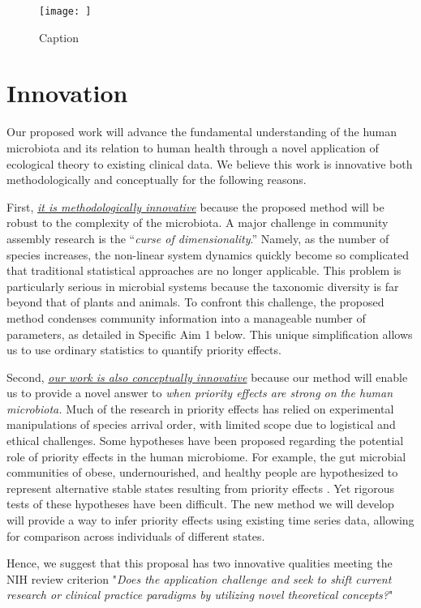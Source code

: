 \documentclass[12pt, class=article, crop=false]{standalone}
\begin{document}
\begin{figure}
    \centering
    \texttt{[image: ]}
    \caption{Caption}
    \label{fig:enter-label}
\end{figure}

\section{Innovation}
Our proposed work will advance the fundamental understanding of the human microbiota and its relation to human health through a novel application of ecological theory to existing clinical data.
We believe this work is innovative both methodologically and conceptually for the following reasons.

First, \ul{\emph{it is methodologically innovative}} because the proposed method will be robust to the complexity of the microbiota.
A major challenge in community assembly research is the ``\textit{curse of dimensionality}.''
Namely, as the number of species increases, the non-linear system dynamics quickly become so complicated that traditional statistical approaches are no longer applicable.
This problem is particularly serious in microbial systems because the taxonomic diversity is far beyond that of plants and animals.
To confront this challenge, the proposed method condenses community information into a manageable number of parameters, as detailed in Specific Aim 1 below. 
This unique simplification allows us to use ordinary statistics to quantify priority effects.

Second, \ul{\emph{our work is also conceptually innovative}} because our method will enable us to provide a novel answer to \textit{when priority effects are strong on the human microbiota.}
Much of the research in priority effects has relied on experimental manipulations of species arrival order, with limited scope due to logistical and ethical challenges.
Some hypotheses have been proposed regarding the potential role of priority effects in the human microbiome.
For example, the gut microbial communities of obese, undernourished, and healthy people are hypothesized to represent alternative stable states resulting from priority effects \citep{fierer_animalcules_2012}.
Yet rigorous tests of these hypotheses have been difficult. 
The new method we will develop will provide a way to infer priority effects using existing time series data, allowing for comparison across individuals of different states.

Hence, we suggest that this proposal has two innovative qualities meeting the NIH review criterion "\emph{Does the application challenge and seek to shift current research or clinical practice paradigms by utilizing novel theoretical concepts?}"
\end{document}
